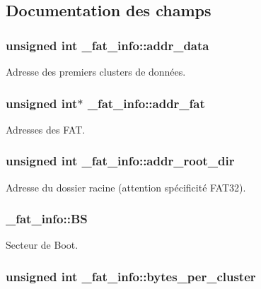 \subsection{Documentation des champs}
\hypertarget{struct__fat__info_a4cb2766e74dd65f24d4eb30ce3b49302}{
\subsubsection[{addr\-\_\-data}]{\setlength{\rightskip}{0pt plus 5cm}unsigned int \-\_\-fat\-\_\-info\-::addr\-\_\-data}}\label{struct__fat__info_a4cb2766e74dd65f24d4eb30ce3b49302}
Adresse des premiers clusters de données. \hypertarget{struct__fat__info_a0344193eb413dce4369b6e36ed03b92b}{
\subsubsection[{addr\-\_\-fat}]{\setlength{\rightskip}{0pt plus 5cm}unsigned int$\ast$ \-\_\-fat\-\_\-info\-::addr\-\_\-fat}}\label{struct__fat__info_a0344193eb413dce4369b6e36ed03b92b}
Adresses des F\-A\-T. \hypertarget{struct__fat__info_ae9133d320e0afc89c5e6cc9cedf6dfb5}{
\subsubsection[{addr\-\_\-root\-\_\-dir}]{\setlength{\rightskip}{0pt plus 5cm}unsigned int \-\_\-fat\-\_\-info\-::addr\-\_\-root\-\_\-dir}}\label{struct__fat__info_ae9133d320e0afc89c5e6cc9cedf6dfb5}
Adresse du dossier racine (attention spécificité F\-A\-T32). \hypertarget{struct__fat__info_adcd12930a4a7f94ecac42ba82567adb7}{
\subsubsection[{B\-S}]{ \-\_\-fat\-\_\-info\-::\-B\-S}}\label{struct__fat__info_adcd12930a4a7f94ecac42ba82567adb7}
Secteur de Boot. \hypertarget{struct__fat__info_ac1ba92d928512827ab7978f136efda96}{
\subsubsection[{bytes\-\_\-per\-\_\-cluster}]{\setlength{\rightskip}{0pt plus 5cm}unsigned int \-\_\-fat\-\_\-info\-::bytes\-\_\-per\-\_\-cluster}}\label{struct__fat__info_ac1ba92d928512827ab7978f136efda96}
